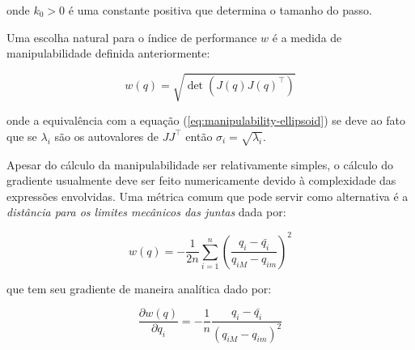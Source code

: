 onde \(k_0 > 0\) é uma constante positiva que determina o tamanho do passo.

Uma escolha natural para o índice de performance \(w\) é a medida de
manipulabilidade definida anteriormente:

\begin{equation}
    w(q) = \sqrt{\det(J(q){J(q)}^\top)}
\end{equation}

onde a equivalência com a equação (\ref{eq:manipulability-ellipsoid}) se deve
ao fato que se \(\lambda_i\) são os autovalores de \(J J^\top\) então
\(\sigma_i = \sqrt{\lambda_i}\).

Apesar do cálculo da manipulabilidade ser relativamente simples, o cálculo do
gradiente usualmente deve ser feito numericamente devido à complexidade das
expressões envolvidas. Uma métrica comum que pode servir como alternativa é a
\emph{distância para os limites mecânicos das juntas} dada por:

\begin{equation}
    w(q) = -\frac{1}{2n} \sum_{i=1}^{n}{{\left(\frac{q_i - \bar{q_i}}{q_{iM} - q_{im}}\right)}^2}
\end{equation}

que tem seu gradiente de maneira analítica dado por:

\begin{equation}
    \frac{\partial w(q)}{\partial q_i} = -\frac{1}{n} \frac{q_i - \bar{q_i}}{{(q_{iM} - q_{im})}^2}
\end{equation}

